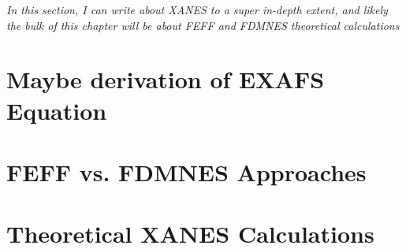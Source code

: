\textit{In this section, I can write about XANES to a super in-depth extent, and likely the bulk of this chapter will be about FEFF and FDMNES theoretical calculations}

\section{Maybe derivation of EXAFS Equation}

\section{FEFF vs. FDMNES Approaches}


\section{Theoretical XANES Calculations}


